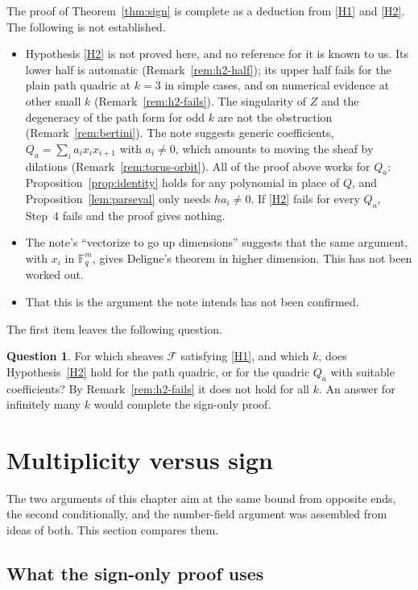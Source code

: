\documentclass[11pt]{amsbook}
\theoremstyle{plain}
\theoremstyle{definition}
\newtheorem{question}[theorem]{Question}
\theoremstyle{remark}
\numberwithin{equation}{section}
\numberwithin{figure}{chapter}
\numberwithin{table}{chapter}
\newcommand{\F}{\mathbb{F}}
\newcommand{\cF}{\mathcal{F}}
\begin{document}
The proof of Theorem~\ref{thm:sign} is complete as a deduction from
\ref{H1} and \ref{H2}. The following is not established.
\begin{itemize}
\item Hypothesis \ref{H2} is not proved here, and no reference for
  it is known to us. Its lower half is automatic
  (Remark~\ref{rem:h2-half}); its upper half fails for the plain
  path quadric at $k=3$ in simple cases, and on numerical evidence
  at other small $k$ (Remark~\ref{rem:h2-fails}). The singularity
  of $Z$ and the degeneracy of the path form for odd $k$ are not
  the obstruction (Remark~\ref{rem:bertini}). The note suggests
  generic coefficients,
  $Q_a = \sum_i a_ix_ix_{i+1}$ with $a_i \ne 0$, which amounts to
  moving the sheaf by dilations (Remark~\ref{rem:torus-orbit}). All
  of the proof
  above works for $Q_a$:
  Proposition~\ref{prop:identity} holds for any polynomial in place
  of $Q$, and Proposition~\ref{lem:parseval} only needs
  $ha_i \ne 0$. If \ref{H2} fails for every $Q_a$, Step~4 fails and
  the proof gives nothing.
\item The note's ``vectorize to go up dimensions'' suggests that
  the same argument, with $x_i$ in $\F_q^m$, gives Deligne's
  theorem in higher dimension. This has not been worked out.
\item That this is the argument the note intends has not been
  confirmed.
\end{itemize}
The first item leaves the following question.

\begin{question}\label{q:sign-h2}
For which sheaves $\cF$ satisfying \ref{H1}, and which $k$, does
Hypothesis~\ref{H2} hold for the path quadric, or for the quadric
$Q_a$ with suitable coefficients? By Remark~\ref{rem:h2-fails} it
does not hold for all $k$. An answer for infinitely many $k$ would
complete the sign-only proof.
\end{question}

\section{Multiplicity versus sign}
\label{sec:discussion}

The two arguments of this chapter aim at the same bound from
opposite ends, the second conditionally, and the number-field
argument was assembled from ideas of both. This section compares them.

\subsection{What the sign-only proof uses}
\end{document}
